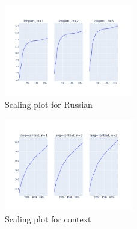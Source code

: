 \documentclass[11pt]{article}
\begin{document}
\begin{figure}[ht]
    \centering
    \includegraphics[width=0.5\textwidth]{week2_scaling_ru.png}
    \caption{Scaling plot for Russian}
    \label{fig:week2_scaling_ru}
\end{figure}

\begin{figure}[ht]
    \centering
    \includegraphics[width=0.5\textwidth]{week2_scaling_context.png}
    \caption{Scaling plot for context}
    \label{fig:week2_scaling_context}
\end{figure}


\end{document}
